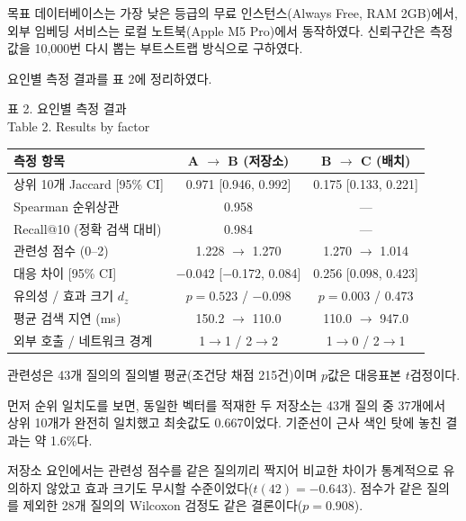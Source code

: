 \documentclass[10pt,a4paper,twocolumn]{article}
\newcommand{\pgsubsec}[1]{\par\vspace{4pt}{\bfseries\fontsize{12}{14}\selectfont #1}\par\nobreak\vspace{1pt}\nobreak}
\begin{document}
목표 데이터베이스는 가장 낮은 등급의 무료 인스턴스(Always Free, RAM 2GB)에서, 외부 임베딩 서비스는 로컬 노트북(Apple M5 Pro)에서 동작하였다. 신뢰구간은 측정값을 10,000번 다시 뽑는 부트스트랩 방식으로 구하였다.

\pgsubsec{3.2 실험 결과}

요인별 측정 결과를 표 2에 정리하였다.

\begin{table}[t]
\centering
{\fontsize{8}{9.6}\selectfont 표 2. 요인별 측정 결과\\
Table 2. Results by factor}
\vspace{4pt}

\fontsize{6.9}{8.1}\selectfont
\setlength{\tabcolsep}{3pt}
\begin{tabular}{@{}lcc@{}}
\toprule
측정 항목 & A $\rightarrow$ B (저장소) & B $\rightarrow$ C (배치) \\
\midrule
상위 10개 Jaccard [95\% CI] & 0.971 [0.946, 0.992] & 0.175 [0.133, 0.221] \\
Spearman 순위상관 & 0.958 & --- \\
Recall@10 (정확 검색 대비) & 0.984 & --- \\
관련성 점수 (0--2) & 1.228 $\rightarrow$ 1.270 & 1.270 $\rightarrow$ 1.014 \\
대응 차이 [95\% CI] & $-$0.042 [$-$0.172, 0.084] & 0.256 [0.098, 0.423] \\
유의성 / 효과 크기 $d_z$ & $p = 0.523$ / $-$0.098 & $p = 0.003$ / 0.473 \\
평균 검색 지연 (ms) & 150.2 $\rightarrow$ 110.0 & 110.0 $\rightarrow$ 947.0 \\
외부 호출 / 네트워크 경계 & 1$\rightarrow$1 / 2$\rightarrow$2 & 1$\rightarrow$0 / 2$\rightarrow$1 \\
\bottomrule
\end{tabular}

\vspace{4pt}
{\fontsize{6.9}{8.1}\selectfont 관련성은 43개 질의의 질의별 평균(조건당 채점 215건)이며 $p$값은 대응표본 $t$검정이다.}
\end{table}

먼저 순위 일치도를 보면, 동일한 벡터를 적재한 두 저장소는 43개 질의 중 37개에서 상위 10개가 완전히 일치했고 최솟값도 0.667이었다. 기준선이 근사 색인 탓에 놓친 결과는 약 1.6\%다.

저장소 요인에서는 관련성 점수를 같은 질의끼리 짝지어 비교한 차이가 통계적으로 유의하지 않았고 효과 크기도 무시할 수준이었다($t(42) = -0.643$). 점수가 같은 질의를 제외한 28개 질의의 Wilcoxon 검정도 같은 결론이다($p = 0.908$).
\end{document}
